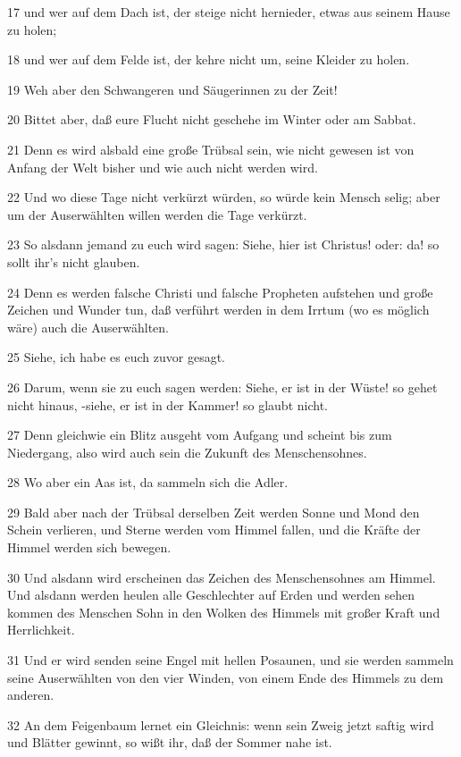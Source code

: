 \par 17 und wer auf dem Dach ist, der steige nicht hernieder, etwas aus seinem Hause zu holen;
\par 18 und wer auf dem Felde ist, der kehre nicht um, seine Kleider zu holen.
\par 19 Weh aber den Schwangeren und Säugerinnen zu der Zeit!
\par 20 Bittet aber, daß eure Flucht nicht geschehe im Winter oder am Sabbat.
\par 21 Denn es wird alsbald eine große Trübsal sein, wie nicht gewesen ist von Anfang der Welt bisher und wie auch nicht werden wird.
\par 22 Und wo diese Tage nicht verkürzt würden, so würde kein Mensch selig; aber um der Auserwählten willen werden die Tage verkürzt.
\par 23 So alsdann jemand zu euch wird sagen: Siehe, hier ist Christus! oder: da! so sollt ihr's nicht glauben.
\par 24 Denn es werden falsche Christi und falsche Propheten aufstehen und große Zeichen und Wunder tun, daß verführt werden in dem Irrtum (wo es möglich wäre) auch die Auserwählten.
\par 25 Siehe, ich habe es euch zuvor gesagt.
\par 26 Darum, wenn sie zu euch sagen werden: Siehe, er ist in der Wüste! so gehet nicht hinaus, -siehe, er ist in der Kammer! so glaubt nicht.
\par 27 Denn gleichwie ein Blitz ausgeht vom Aufgang und scheint bis zum Niedergang, also wird auch sein die Zukunft des Menschensohnes.
\par 28 Wo aber ein Aas ist, da sammeln sich die Adler.
\par 29 Bald aber nach der Trübsal derselben Zeit werden Sonne und Mond den Schein verlieren, und Sterne werden vom Himmel fallen, und die Kräfte der Himmel werden sich bewegen.
\par 30 Und alsdann wird erscheinen das Zeichen des Menschensohnes am Himmel. Und alsdann werden heulen alle Geschlechter auf Erden und werden sehen kommen des Menschen Sohn in den Wolken des Himmels mit großer Kraft und Herrlichkeit.
\par 31 Und er wird senden seine Engel mit hellen Posaunen, und sie werden sammeln seine Auserwählten von den vier Winden, von einem Ende des Himmels zu dem anderen.
\par 32 An dem Feigenbaum lernet ein Gleichnis: wenn sein Zweig jetzt saftig wird und Blätter gewinnt, so wißt ihr, daß der Sommer nahe ist.
